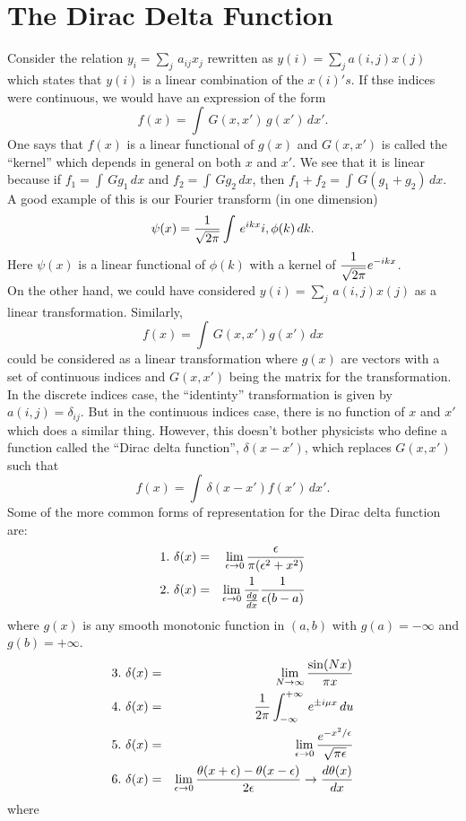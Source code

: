 \section{The Dirac Delta Function}
Consider the relation $\displaystyle y_i = \sum_j \, a_{ij} x_j$ rewritten as $\displaystyle y(i) = \sum_j a(i,j) x(j)$ which states that $y(i)$ is a linear combination of the $x(i)'s$.
If thse indices were continuous, we would have an expression of the form
$$f(x) = \int\, G(x,x') \, g(x') \, dx'.$$ One says that $f(x)$ is a linear functional of $g(x)$ and $G(x,x')$ is called the ``kernel'' which depends in general on both $x$ and $x'$. We see that it is linear
because if $f_1 = \int\, G g_1\,dx$ and $f_2 = \int\, G g_2\,dx$, then $f_1 + f_2 = \int\, G(g_1 + g_2)\, dx$. A good example of this is our Fourier transform (in one dimension)
$$\psi(x) = {1\over \sqrt{2\pi}}\int\, e^{ikx}i, \phi(k)\, dk.$$ Here $\psi(x)$ is a linear functional of $\phi(k)$ with a kernel of $\displaystyle {1\over\sqrt{2\pi}}e^{-ikx}$. \\
On the other hand, we could have considered $\displaystyle y(i) = \sum_j\, a(i,j) x(j)$ as a linear transformation. Similarly, 
$$f(x) = \int\, G(x,x') g(x')\,dx$$ could be considered as a linear transformation where $g(x)$ are vectors with a set of continuous indices and $G(x,x')$ being the matrix for the transformation.\\
In the discrete indices case, the ``identinty'' transformation is given by $a(i,j) = \delta_{ij}$. But in the continuous indices case, there is no function of $x$ and $x'$ which does a similar thing. However, 
this doesn't bother physicists who define a function called the ``Dirac delta function'', $\delta(x-x')$, which replaces $G(x,x')$ such that $$f(x) = \int \, \delta(x-x') f(x')\, dx'.$$ Some of the more common forms 
of representation for the Dirac delta function are:
\begin{eqnarray*}
1.\ \delta(x) &=& \lim_{\epsilon\rightarrow 0} {\epsilon\over \pi (\epsilon^2 + x^2)}\\
2.\ \delta(x) &=& \lim_{\epsilon\rightarrow 0} {1\over {dg\over dx} } {1\over \epsilon(b-a)}
\end{eqnarray*}where $g(x)$ is any smooth monotonic function in $(a,b)$ with $g(a) = -\infty$ and $g(b) = +\infty$. 
\begin{eqnarray*}
3.\ \delta(x) &=& \lim_{N\rightarrow \infty} {\sin(Nx)\over \pi x}\\
4.\ \delta(x) &=& {1\over 2\pi} \int_{-\infty}^{+\infty} \, e^{\pm i\mu x}\, du\\
5.\ \delta(x) &=& \lim_{\epsilon\rightarrow 0} {e^{-x^2/\epsilon}\over \sqrt{\pi\epsilon}}\\
6.\ \delta(x) &=& \lim_{\epsilon\rightarrow 0} {\theta(x+\epsilon) - \theta(x-\epsilon)\over 2\epsilon} \rightarrow {d\theta(x)\over dx}\\
\end{eqnarray*}where 
